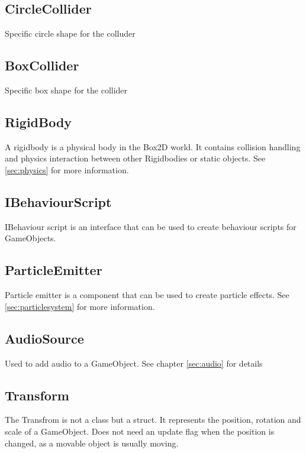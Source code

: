 \subsection{CircleCollider}
Specific circle shape for the colluder
\subsection{BoxCollider}
Specific box shape for the collider

\subsection{RigidBody}
A rigidbody is a physical body in the Box2D world. It contains collision handling and physics interaction between other Rigidbodies or static objects.
See \autoref{sec:physics} for more information.

\subsection{IBehaviourScript}
IBehaviour script is an interface that can be used to create behaviour scripts for GameObjects.

\subsection{ParticleEmitter}
Particle emitter is a component that can be used to create particle effects.
See \autoref{sec:particlesystem} for more information.

\subsection{AudioSource}
Used to add audio to a GameObject. See chapter \autoref{sec:audio} for details

\subsection{Transform}
The Transfrom is not a class but a struct. It represents the position, rotation and scale of a GameObject.
Does not need an update flag when the position is changed, as a movable object is usually moving.


